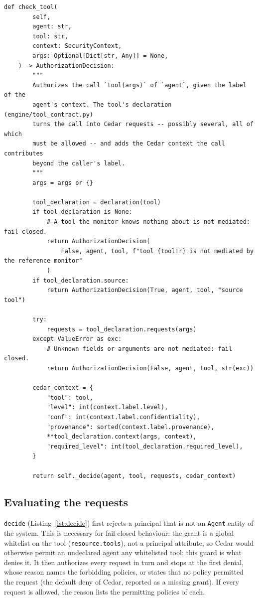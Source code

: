 \documentclass[11pt,a4paper]{article}
\DeclareRobustCommand{\code}[1]{{\renewcommand{\_}{\textunderscore\allowbreak}\texttt{#1}}}
\begin{document}
\begin{lstlisting}[firstnumber=37,style=py,caption={Authorizing a tool call (\texttt{engine/engine.py}, lines 37--77)},label={lst:checktool}]
    def check_tool(
        self,
        agent: str,
        tool: str,
        context: SecurityContext,
        args: Optional[Dict[str, Any]] = None,
    ) -> AuthorizationDecision:
        """
        Authorizes the call `tool(args)` of `agent`, given the label of the
        agent's context. The tool's declaration (engine/tool_contract.py)
        turns the call into Cedar requests -- possibly several, all of which
        must be allowed -- and adds the Cedar context the call contributes
        beyond the caller's label.
        """
        args = args or {}

        tool_declaration = declaration(tool)
        if tool_declaration is None:
            # A tool the monitor knows nothing about is not mediated: fail closed.
            return AuthorizationDecision(
                False, agent, tool, f"tool {tool!r} is not mediated by the reference monitor"
            )
        if tool_declaration.source:
            return AuthorizationDecision(True, agent, tool, "source tool")

        try:
            requests = tool_declaration.requests(args)
        except ValueError as exc:
            # Unknown fields or arguments are not mediated: fail closed.
            return AuthorizationDecision(False, agent, tool, str(exc))

        cedar_context = {
            "tool": tool,
            "level": int(context.label.level),
            "conf": int(context.label.confidentiality),
            "provenance": sorted(context.label.provenance),
            **tool_declaration.context(args, context),
            "required_level": int(tool_declaration.required_level),
        }

        return self._decide(agent, tool, requests, cedar_context)
\end{lstlisting}

\subsection{Evaluating the requests}

\code{\_decide} (Listing~\ref{lst:decide}) first rejects a principal that is not an
\code{Agent} entity of the system. This is necessary for fail-closed behaviour: the grant
is a global whitelist on the tool (\code{resource.tools}), not a principal attribute,
so Cedar would otherwise permit an undeclared agent any whitelisted tool; this guard is
what denies it. It then authorizes every request in turn and stops at the first
denial, whose reason names the forbidding policies, or states that no policy permitted
the request (the default deny of Cedar, reported as a missing grant). If every request
is allowed, the reason lists the permitting policies of each.
\end{document}
